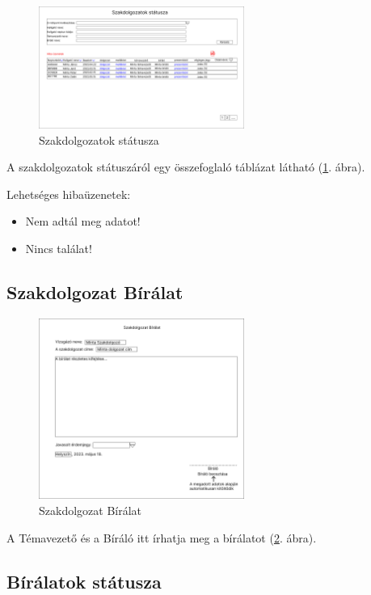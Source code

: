 \documentclass[a4paper,12pt]{article}
\begin{document}
\begin{figure}[h!]
	\centering
	\includegraphics[width=0.6\textwidth]{images/Web_pages/Thesis_Status.jpg}
	\caption{Szakdolgozatok státusza}
	\label{fig:Thesis_Status}
\end{figure}

A szakdolgozatok státuszáról egy összefoglaló táblázat látható (\ref{fig:Thesis_Status}. ábra).

Lehetséges hibaüzenetek:
\begin{itemize}
	\item Nem adtál meg adatot!
	\item Nincs találat!
\end{itemize}

\subsection{Szakdolgozat Bírálat}

\begin{figure}[h!]
	\centering
	\includegraphics[width=0.6\textwidth]{images/Web_pages/Thesis_Review.jpg}
	\caption{Szakdolgozat Bírálat}
	\label{fig:Thesis_Review}
\end{figure}

A Témavezető és a Bíráló itt írhatja meg a bírálatot (\ref{fig:Thesis_Review}. ábra).

\subsection{Bírálatok státusza}
\end{document}
